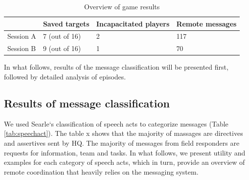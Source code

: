\begin{table}[h]
\footnotesize
\begin{tabular}{llll}
\multicolumn{1}{l|}{} & Saved targets & Incapacitated players & Remote messages \\ \hline
\multicolumn{1}{l|}{Session A} & 7 (out of 16) & 2                    & 117             \\ 
\multicolumn{1}{l|}{Session B} & 9 (out of 16) & 1                    & 70              \\ 
\end{tabular}
\caption{Overview of game results}
\label{tab:gameResults1}
\end{table}


In what follows, results of the message classification will be presented first, followed by detailed analysis of episodes.\\


\subsection{Results of message classification}
We used Searle`s classification of speech acts to categorize messages (Table \ref{tab:speechact}). The table x shows that the majority of massages are directives and assertives sent by HQ. The majority of messages from field responders are requests for information, team and tasks. In what follows, we present utility and examples for each category of speech acts, which in turn, provide an overview of remote coordination that heavily relies on the messaging system. \\

